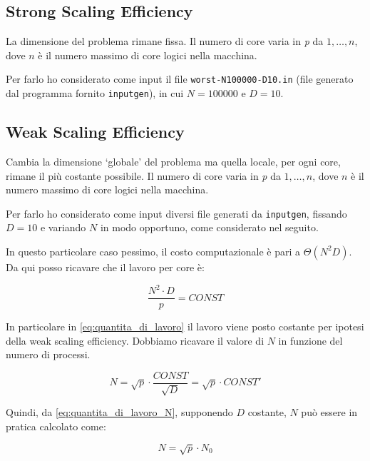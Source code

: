 \documentclass[12pt, a4paper]{article}
\begin{document}
\subsection{Strong Scaling Efficiency}

La dimensione del problema rimane fissa.
Il numero di core varia in \textit{p} da \({1, \dots, n}\), dove \(n\) è il numero massimo di core logici nella macchina.

Per farlo ho considerato come input il file \texttt{worst-N100000-D10.in} (file generato dal programma fornito \texttt{inputgen}),
in cui \(N = 100000\) e \(D = 10\).

\subsection{Weak Scaling Efficiency}

Cambia la dimensione `globale' del problema ma quella locale, per ogni core, rimane il più costante possibile.
Il numero di core varia in \textit{p} da \({1, \dots, n}\), dove \(n\) è il numero massimo di core logici nella macchina.

Per farlo ho considerato come input diversi file generati da \texttt{inputgen}, fissando \(D = 10\) e variando \(N\) in modo
opportuno, come considerato nel seguito.

In questo particolare caso pessimo, il costo computazionale è pari a \(\Theta(N^2D)\).
Da qui posso ricavare che il lavoro per core è:

\begin{equation} \label{eq:quantita_di_lavoro}
  \frac{N^2 \cdot D}{p} = CONST
\end{equation}

In particolare in \autoref{eq:quantita_di_lavoro} il lavoro viene posto costante per ipotesi della weak scaling efficiency.
Dobbiamo ricavare il valore di \(N\) in funzione del numero di processi.

\begin{equation} \label{eq:quantita_di_lavoro_N}
  N = \sqrt{p} \cdot \frac{CONST}{\sqrt{D}} = \sqrt{p} \cdot CONST'
\end{equation}

Quindi, da \autoref{eq:quantita_di_lavoro_N}, supponendo \(D\) costante, \(N\) può essere in pratica calcolato come:

\begin{equation} \label{eq:quantita_di_lavoro_N_pratico}
  N = \sqrt{p} \cdot N_0
\end{equation}
\end{document}
